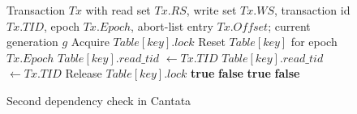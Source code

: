 \documentclass[english,preprint,JIP]{ipsj}
\begin{document}
\begin{figure}[!t]
\begin{algorithm}[H]
    \caption{Second dependency check in Cantata}
    \label{alg2}
    \begin{algorithmic}[1]  
    \Require Transaction $Tx$ with read set $Tx.RS$, write set $Tx.WS$, transaction id $Tx.TID$, epoch $Tx.Epoch$, abort-list entry $Tx.Offset$; current generation $g$
                \State Acquire $\textit{Table}[key].lock$
                    \State Reset $\textit{Table}[key]$ for epoch $Tx.Epoch$
                    \State $\textit{Table}[key].read\_tid$ $\gets Tx.TID$
                    \State $\textit{Table}[key].read\_tid$ $\gets Tx.TID$
                \EndIf
                \State Release $\textit{Table}[key].lock$
            \EndFor
        \EndFunction
        \State
                    \State \Return \textbf{true}
                \EndIf
            \EndFor
            \State \Return \textbf{false}
        \EndFunction
        \State
                    \State \Return \textbf{true}
                \EndIf
            \EndFor
            \State \Return \textbf{false}
        \EndFunction
    \end{algorithmic}
\end{algorithm}
\end{figure}
\end{document}
